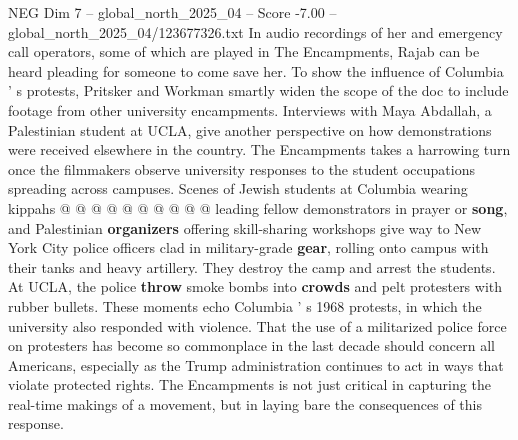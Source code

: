 \begin{textsample}{NEG Dim 7 – global\_north\_2025\_04 – Score -7.00 – global\_north\_2025\_04/123677326.txt}
In audio recordings of her and emergency call operators, some of which are played in The Encampments, Rajab can be heard pleading for someone to come save her.
To show the influence of Columbia ' s protests, Pritsker and Workman smartly widen the scope of the doc to include footage from other university encampments.
Interviews with Maya Abdallah, a Palestinian student at UCLA, give another perspective on how demonstrations were received elsewhere in the country.
The Encampments takes a harrowing turn once the filmmakers observe university responses to the student occupations spreading across campuses.
Scenes of Jewish students at Columbia wearing kippahs @ @ @ @ @ @ @ @ @ @ leading fellow demonstrators in prayer or \textbf{song}, and Palestinian \textbf{organizers} offering skill-sharing workshops give way to New York City police officers clad in military-grade \textbf{gear}, rolling onto campus with their tanks and heavy artillery.
They destroy the camp and arrest the students.
At UCLA, the police \textbf{throw} smoke bombs into \textbf{crowds} and pelt protesters with rubber bullets.
These moments echo Columbia ' s 1968 protests, in which the university also responded with violence.
That the use of a militarized police force on protesters has become so commonplace in the last decade should concern all Americans, especially as the Trump administration continues to act in ways that violate protected rights.
The Encampments is not just critical in capturing the real-time makings of a movement, but in laying bare the consequences of this response.

\end{textsample}
